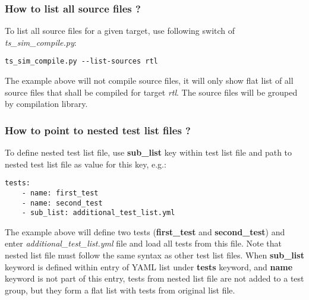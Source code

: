 \documentclass{tropic_design_spec}
\begin{document}
\subsubsection{How to list all source files ?}
\label{sec:how-to-list-all-source-files}

To list all source files for a given target, use following switch of
\textit{ts_sim_compile.py}:

\begin{lstlisting}
ts_sim_compile.py --list-sources rtl
\end{lstlisting}

The example above will not compile source files, it will only show flat list
of all source files that shall be compiled for target \textit{rtl}. The source
files will be grouped by compilation library.


\subsubsection{How to point to nested test list files ?}
\label{sec:how-to-point-to-nested-test-list-files}

To define nested test list file, use \textbf{sub_list} key within test list file and
path to nested test list file as value for this key, e.g.:

\begin{lstlisting}
tests:
    - name: first_test
    - name: second_test
    - sub_list: additional_test_list.yml
\end{lstlisting}

The example above will define two tests (\textbf{first_test} and \textbf{second_test})
and enter \textit{additional_test_list.yml} file and load all tests from this file.
Note that nested list file must follow the same syntax as other test list files.
When \textbf{sub_list} keyword is defined within entry of YAML list under \textbf{tests}
keyword, and \textbf{name} keyword is not part of this entry, tests from nested
list file are not added to a test group, but they form a flat list with tests from
original list file.

\end{document}
